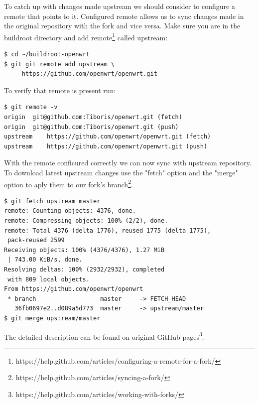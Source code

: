 To catch up with changes made upstream we should consider to configure a remote that points to it.
Configured remote allows us to sync changes made in the original repository with the fork and vice versa.
Make sure you are in the buildroot directory and add remote\footnote{https://help.github.com/articles/configuring-a-remote-for-a-fork/} called upstream:
\begin{lstlisting}[columns=fixed,basicstyle=\ttfamily\footnotesize,basicstyle=\ttfamily\footnotesize,tabsize=4,backgroundcolor=\color{yellow!10}]
$ cd ~/buildroot-openwrt
$ git git remote add upstream \
     https://github.com/openwrt/openwrt.git
\end{lstlisting}
To verify that remote is present run:
\begin{lstlisting}[columns=fixed,basicstyle=\ttfamily\footnotesize,basicstyle=\ttfamily\footnotesize,tabsize=4,backgroundcolor=\color{yellow!10}]
$ git remote -v
origin	git@github.com:Tiboris/openwrt.git (fetch)
origin	git@github.com:Tiboris/openwrt.git (push)
upstream	https://github.com/openwrt/openwrt.git (fetch)
upstream	https://github.com/openwrt/openwrt.git (push)
\end{lstlisting}
With the remote conficured correctly we can now sync with
 upstream repository.
To download latest upstream changes use the "fetch" option
 and  the "merge" option to aply them to our fork's branch\footnote{https://help.github.com/articles/syncing-a-fork/}.
\begin{lstlisting}[columns=fixed,basicstyle=\ttfamily\footnotesize,basicstyle=\ttfamily\footnotesize,tabsize=4,backgroundcolor=\color{yellow!10}]
$ git fetch upstream master
remote: Counting objects: 4376, done.
remote: Compressing objects: 100% (2/2), done.
remote: Total 4376 (delta 1776), reused 1775 (delta 1775),
 pack-reused 2599
Receiving objects: 100% (4376/4376), 1.27 MiB
 | 743.00 KiB/s, done.
Resolving deltas: 100% (2932/2932), completed
 with 809 local objects.
From https://github.com/openwrt/openwrt
 * branch                  master     -> FETCH_HEAD
   36fb0697e2..d089a5d773  master     -> upstream/master
$ git merge upstream/master
\end{lstlisting}
The detailed description can be found on original GitHub pages\footnote{https://help.github.com/articles/working-with-forks/}.
